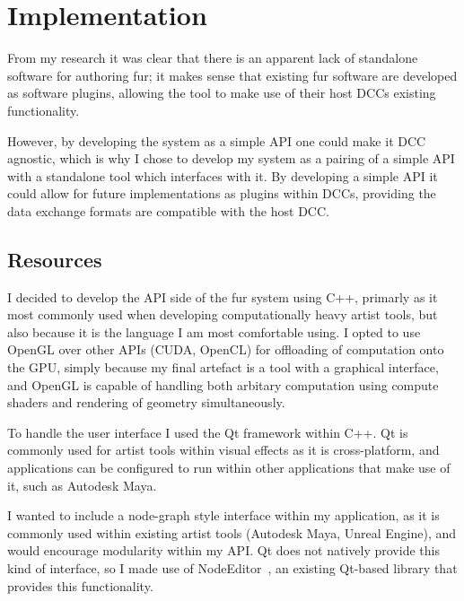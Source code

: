 \documentclass[]{acmsiggraph}
\begin{document}

\section{Implementation} \label{sec:implementation}
From my research it was clear that there is an apparent lack of standalone software for authoring fur; it makes sense that existing fur software are developed as software plugins, allowing the tool to make use of their host DCCs existing functionality.

However, by developing the system as a simple API one could make it DCC agnostic, which is why I chose to develop my system as a pairing of a simple API with a standalone tool which interfaces with it. By developing a simple API it could allow for future implementations as plugins within DCCs, providing the data exchange formats are compatible with the host DCC.

\subsection{Resources} \label{sec:resources}
I decided to develop the API side of the fur system using C++, primarly as it most commonly used when developing computationally heavy artist tools, but also because it is the language I am most comfortable using. I opted to use OpenGL over other APIs (CUDA, OpenCL) for offloading of computation onto the GPU, simply because my final artefact is a tool with a graphical interface, and OpenGL is capable of handling both arbitary computation using compute shaders and rendering of geometry simultaneously.

To handle the user interface I used the Qt framework within C++. Qt is commonly used for artist tools within visual effects as it is cross-platform, and applications can be configured to run within other applications that make use of it, such as Autodesk Maya.

I wanted to include a node-graph style interface within my application, as it is commonly used within existing artist tools (Autodesk Maya, Unreal Engine), and would encourage modularity within my API. Qt does not natively provide this kind of interface, so I made use of NodeEditor~\cite{Pinaev2017}, an existing Qt-based library that provides this functionality.
\end{document}
